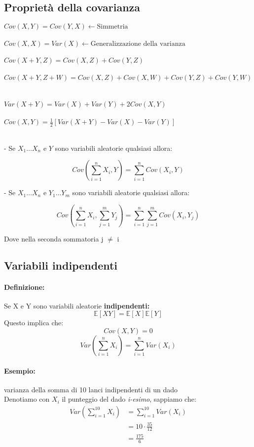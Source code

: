 \documentclass[]{article}
\newcommand{\ev}{\mathbb{E}[X]}
\renewcommand{\ev}[1]{\mathbb{E}[#1]}
\newcommand{\definizione}{\paragraph{Definizione:}}
\begin{document}
    \subsection{Proprietà della covarianza}
    $ Cov(X, Y) = Cov(Y, X) \longleftarrow \text{Simmetria} $ \\ \\
    $ Cov(X, X) = Var(X) \longleftarrow \text{Generalizzazione della varianza} $ \\ \\
    $ Cov(X+Y, Z) = Cov(X, Z) + Cov(Y, Z) $ \\ \\
    $ Cov(X+Y, Z+W) = Cov(X, Z) + Cov(X, W) + Cov(Y, Z) + Cov(Y, W) $ \\ \\ \\
    $ Var(X + Y) = Var(X) + Var(Y) + 2 Cov(X, Y) $ \\ \\
    $ Cov(X,Y) = \frac{1}{2}[Var(X+Y) - Var(X) - Var(Y)] $ \\ \\
    \centerline{- Se $X_1 \ldots X_n$ e $Y $ sono variabili aleatorie qualsiasi allora:}
    \[ Cov(\sum_{i = 1}^{n}X_i, Y) = \sum_{i = 1}^{n} Cov(X_i, Y) \]
    \centerline{- Se $X_1 \ldots X_n$ e $Y_1 \ldots Y_m$ sono variabili aleatorie qualsiasi allora:}
    \[ Cov(\sum_{i = 1}^{n}X_i, \sum_{j = 1}^{m} Y_j) = \sum_{i = 1}^{n} \sum_{j = 1}^{m} Cov(X_i, Y_j) \]
    \centerline{Dove nella seconda sommatoria j $\not =$ i}
    \subsection{Variabili indipendenti}
    \definizione Se X e Y sono variabili aleatorie \textbf{indipendenti:}
    \[ \ev{XY} = \ev{X} \ev{Y} \]
    Questo implica che:
    \[ Cov(X, Y) = 0 \]
    \[ \displaystyle{Var(\sum_{i = 1}^{n} X_i) = \sum_{i = 1}^{n} Var(X_i)}\]
    \paragraph{Esempio:} varianza della somma di 10 lanci indipendenti di un dado \\
    Denotiamo con \textbf{$X_i$} il punteggio del dado \textit{i-esimo}, sappiamo che:
    \begin{equation*}
        \begin{split}
            Var(\sum_{i = 1}^{10} X_i) &= \sum_{i = 1}^{10} Var(X_i) \\
            & = 10 \cdot \frac{35}{12} \\
            & = \frac{175}{6}
        \end{split}
    \end{equation*}
\end{document}
